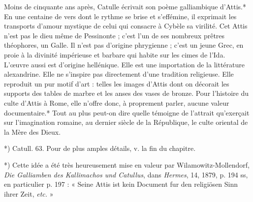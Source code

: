 \documentclass[a4paper, 11pt, oneside, polutonikogreek, french]{article}
\begin{document}
Moins de cinquante ans après, Catulle écrivait son poème galliambique d'Attis.* En une centaine de vers dont le rythme se brise et s'effémine, il exprimait les transports d'amour mystique de celui qui consacre à Cybèle sa virilité. Cet Attis n'est pas le dieu même de Pessinonte ; c'est l'un de ses nombreux prêtres théophores, un Galle. Il n'est pas d'origine phrygienne ; c'est un jeune Grec, en proie à la divinité impérieuse et barbare qui habite sur les cimes de l'Ida. L'œuvre aussi est d'origine hellénique. Elle est une importation de la littérature alexandrine. Elle ne s'inspire pas directement d'une tradition religieuse. Elle reproduit un pur motif d'art : telles les images d'Attis dont on décorait les supports des tables de marbre et les anses des vases de bronze. Pour l'histoire du culte d'Attis à Rome, elle n'offre donc, à proprement parler, aucune valeur documentaire.* Tout au plus peut-on dire quelle témoigne de l'attrait qu'exerçait sur l'imagination romaine, au dernier siècle de la République, le culte oriental de la Mère des Dieux.

*) Catull. 63. Pour de plus amples détails, v. la fin du chapitre.

*) Cette idée a été très heureusement mise en valeur par Wilamowitz-Mollendorf, \emph{Die Galliamben des Kallimachos und Catullus}, dans \emph{Hermes}, 14, 1879, p. 194 ss, en particulier p. 197 : « Seine Attis ist kein Document fur den religiösen Sinn ihrer Zeit, \emph{etc.} »
\end{document}
